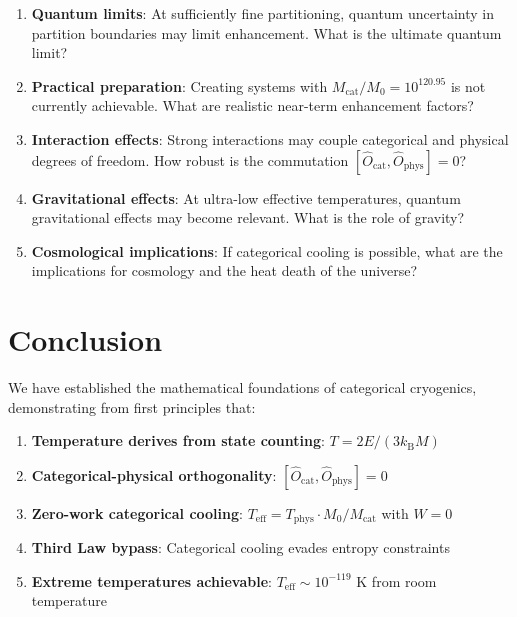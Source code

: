 \documentclass[twocolumn,10pt,twoside]{article}
\newcommand{\kb}{k_{\mathrm{B}}}
\newcommand{\Ocat}{\hat{O}_{\mathrm{cat}}}
\newcommand{\Ophys}{\hat{O}_{\mathrm{phys}}}
\newcommand{\Teff}{T_{\mathrm{eff}}}
\newcommand{\Tphys}{T_{\mathrm{phys}}}
\newcommand{\Mcat}{M_{\mathrm{cat}}}
\begin{document}
\begin{enumerate}
    \item \textbf{Quantum limits}: At sufficiently fine partitioning, quantum uncertainty in partition boundaries may limit enhancement. What is the ultimate quantum limit?

    \item \textbf{Practical preparation}: Creating systems with $\Mcat/M_0 = 10^{120.95}$ is not currently achievable. What are realistic near-term enhancement factors?

    \item \textbf{Interaction effects}: Strong interactions may couple categorical and physical degrees of freedom. How robust is the commutation $[\Ocat, \Ophys] = 0$?

    \item \textbf{Gravitational effects}: At ultra-low effective temperatures, quantum gravitational effects may become relevant. What is the role of gravity?

    \item \textbf{Cosmological implications}: If categorical cooling is possible, what are the implications for cosmology and the heat death of the universe?
\end{enumerate}

\section{Conclusion}

We have established the mathematical foundations of categorical cryogenics, demonstrating from first principles that:

\begin{enumerate}
    \item \textbf{Temperature derives from state counting}: $T = 2E/(3\kb M)$

    \item \textbf{Categorical-physical orthogonality}: $[\Ocat, \Ophys] = 0$

    \item \textbf{Zero-work categorical cooling}: $\Teff = \Tphys \cdot M_0/\Mcat$ with $W = 0$

    \item \textbf{Third Law bypass}: Categorical cooling evades entropy constraints

    \item \textbf{Extreme temperatures achievable}: $\Teff \sim 10^{-119}$ K from room temperature
\end{enumerate}
\end{document}
